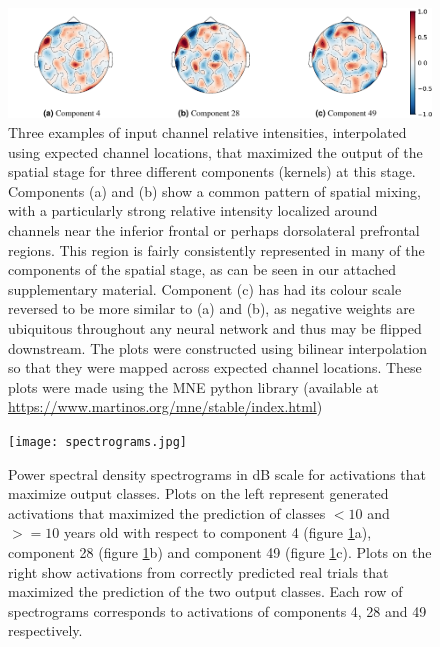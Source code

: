 \documentclass[fleqn,10pt]{wlscirep}
\begin{document}
\begin{figure}[h!]
  \centering\includegraphics[width=\linewidth]{components.pdf}
  \caption[textfind]{Three examples of input channel relative intensities, interpolated using expected channel locations, that maximized the output of the spatial stage for three different components (kernels) at this stage. Components (a) and (b) show a common pattern of spatial mixing, with a particularly strong relative intensity localized around channels near the inferior frontal or perhaps dorsolateral prefrontal regions. This region is fairly consistently represented in many of the components of the spatial stage, as can be seen in our attached supplementary material. Component (c) has had its colour scale reversed to be more similar to (a) and (b), as negative weights are ubiquitous throughout any neural network and thus may be flipped downstream. The plots were constructed using bilinear interpolation so that they were mapped across expected channel locations. These plots were made using the MNE python library (available at \url{https://www.martinos.org/mne/stable/index.html})}
  \label{fig:max_components}
\end{figure}


\begin{figure}[ht]
  \caption{Power spectral density spectrograms in dB scale for activations that maximize output classes. Plots on the left represent generated activations that maximized the prediction of classes $<10$ and $>=10$ years old with respect to component 4 (figure \ref{fig:max_components}a), component 28 (figure \ref{fig:max_components}b) and component 49 (figure \ref{fig:max_components}c). Plots on the right show activations from correctly predicted real trials that maximized the prediction of the two output classes. Each row of spectrograms corresponds to activations of components 4, 28 and 49 respectively.}
  \centering\texttt{[image: spectrograms.jpg]}
 \label{fig:max_spectrograms}
\end{figure}
\end{document}
